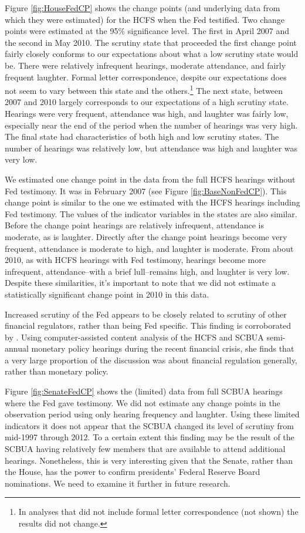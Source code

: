 \documentclass[a4paper]{article}\usepackage[]{graphicx}\usepackage[]{color}
\begin{document}
Figure \ref{fig:HouseFedCP} shows the change points (and underlying data from which they were estimated) for the HCFS when the Fed testified. Two change points were estimated at the 95\% significance level. The first in April 2007 and the second in May 2010. The scrutiny state that proceeded the first change point fairly closely conforms to our expectations about what a low scrutiny state would be. There were relatively infrequent hearings, moderate attendance, and fairly frequent laughter. Formal letter correspondence, despite our expectations does not seem to vary between this state and the others.\footnote{In analyses that did not include formal letter correspondence (not shown) the results did not change.} The next state, between 2007 and 2010 largely corresponds to our expectations of a high scrutiny state. Hearings were very frequent, attendance was high, and laughter was fairly low, especially near the end of the period when the number of hearings was very high. The final state had characteristics of both high and low scrutiny states. The number of hearings was relatively low, but attendance was high and laughter was very low.

We estimated one change point in the data from the full HCFS hearings without Fed testimony. It was in February 2007 (see Figure \ref{fig:BaseNonFedCP}). This change point is similar to the one we estimated with the HCFS hearings including Fed testimony. The values of the indicator variables in the states are also similar. Before the change point hearings are relatively infrequent, attendance is moderate, as is laughter. Directly after the change point hearings become very frequent, attendance is moderate to high, and laughter is moderate. From about 2010, as with HCFS hearings with Fed testimony, hearings become more infrequent, attendance--with a brief lull--remains high, and laughter is very low. Despite these similarities, it's important to note that we did not estimate a statistically significant change point in 2010 in this data.

Increased scrutiny of the Fed appears to be closely related to scrutiny of other financial regulators, rather than being Fed specific. This finding is corroborated by \cite{SchonhardtBailey2012}. Using computer-assisted content analysis of the HCFS and SCBUA semi-annual monetary policy hearings during the recent financial crisis, she finds that a very large proportion of the discussion was about financial regulation generally, rather than monetary policy.

Figure \ref{fig:SenateFedCP} shows the (limited) data from full SCBUA hearings where the Fed gave testimony. We did not estimate any change points in the observation period using only hearing frequency and laughter. Using these limited indicators it does not appear that the SCBUA changed its level of scrutiny from mid-1997 through 2012. To a certain extent this finding may be the result of the SCBUA having relatively few members that are available to attend additional hearings. Nonetheless, this is very interesting given that the Senate, rather than the House, has the power to confirm presidents' Federal Reserve Board nominations. We need to examine it further in future research.
\end{document}
